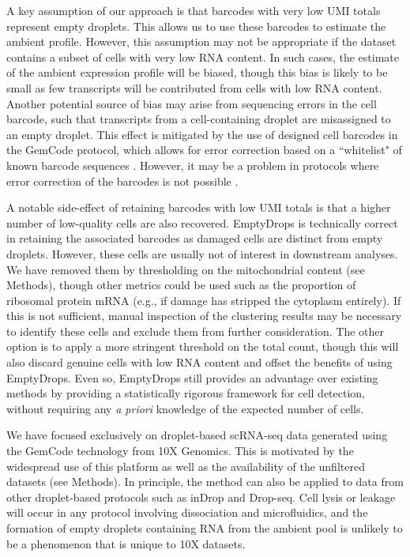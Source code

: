 \documentclass{bmcart}
\begin{document}
A key assumption of our approach is that barcodes with very low UMI totals represent empty droplets.
This allows us to use these barcodes to estimate the ambient profile.
However, this assumption may not be appropriate if the dataset contains a subset of cells with very low RNA content.
In such cases, the estimate of the ambient expression profile will be biased, though this bias is likely to be small as few transcripts will be contributed from cells with low RNA content.
Another potential source of bias may arise from sequencing errors in the cell barcode, such that transcripts from a cell-containing droplet are misassigned to an empty droplet.
This effect is mitigated by the use of designed cell barcodes in the GemCode protocol, which allows for error correction based on a ``whitelist" of known barcode sequences \cite{zheng2017massively}.
However, it may be a problem in protocols where error correction of the barcodes is not possible \cite{macosko2015highly}.


A notable side-effect of retaining barcodes with low UMI totals is that a higher number of low-quality cells are also recovered.
EmptyDrops is technically correct in retaining the associated barcodes as damaged cells are distinct from empty droplets.
However, these cells are usually not of interest in downstream analyses. 
We have removed them by thresholding on the mitochondrial content (see Methods), though other metrics could be used such as the proportion of ribosomal protein mRNA (e.g., if damage has stripped the cytoplasm entirely).
If this is not sufficient, manual inspection of the clustering results may be necessary to identify these cells and exclude them from further consideration.
The other option is to apply a more stringent threshold on the total count, though this will also discard genuine cells with low RNA content and offset the benefits of using EmptyDrops.
Even so, EmptyDrops still provides an advantage over existing methods by providing a statistically rigorous framework for cell detection, 
without requiring any \textit{a priori} knowledge of the expected number of cells.

We have focused exclusively on droplet-based scRNA-seq data generated using the GemCode technology from 10X Genomics.
This is motivated by the widespread use of this platform as well as the availability of the unfiltered datasets (see Methods).
In principle, the method can also be applied to data from other droplet-based protocols such as inDrop and Drop-seq. 
Cell lysis or leakage will occur in any protocol involving dissociation and microfluidics,
and the formation of empty droplets containing RNA from the ambient pool is unlikely to be a phenomenon that is unique to 10X datasets.
\end{document}
